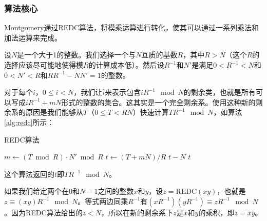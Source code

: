 \subsubsection{算法核心}

Montgomery通过REDC算法，将模乘运算进行转化，使其可以通过一系列乘法和加法运算来完成。

设$N$是一个大于1的整数。我们选择一个与$N$互质的基数$R$，其中$R > N$（这个$R$的选择应该尽可能地使得模$R$的计算成本低）。然后设$R^{-1}$和$N'$是满足$0 < R^{-1} < N$和$0 < N' < R$和$RR^{-1} - NN' = 1$的整数。

对于每个$i$，$0 \leq i < N$，我们让$\bar{i}$来表示包含$iR^{-1} \mod N$的剩余类，也就是所有可以写成$iR^{-1} + mN$形式的整数的集合。这其实是一个完全剩余系。使用这种新的剩余系的原因是我们能够从$T$（$0 \leq T < RN$）快速计算$TR^{-1} \mod N$，如算法\ref{alg:redc}所示：

\begin{algorithm}
	\caption{REDC算法}\label{alg:redc}
	\begin{algorithmic}[1]
		\State $m \gets (T \bmod R) \cdot N' \bmod R$ 
		\State $t \gets (T + mN) / R$
		\State \Return $t - N$
		\Else
		\State \Return $t$
		\EndIf
		\EndProcedure
	\end{algorithmic}
\end{algorithm}

这个算法返回的$t$即$TR^{-1} \mod N$。

如果我们给定两个在$0$和$N-1$之间的整数$x$和$y$，设$z = \text{REDC}(xy)$，也就是$z \equiv (xy) R^{-1} \mod N$。等式两边同乘$R^{-1}$有$(xR^{-1})(yR^{-1}) \equiv zR^{-1} \mod N$。因为REDC算法给出的$z < N$，所以在新的剩余系下$z$是$x$和$y$的乘积，即$\bar{z} = \bar{x}\bar{y}$。